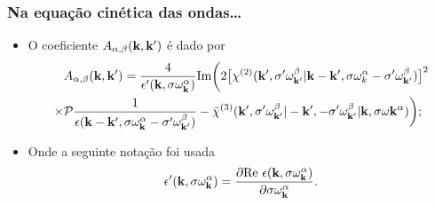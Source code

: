 \documentclass[10pt,aspectratio=1610,lualatex]{beamer}
\begin{document}
\begin{frame}
  \frametitle{Na equação cinética das ondas\dots}
  \begin{itemize}
    \item O coeficiente $A_{\alpha,\beta}({\bf k,k'})$ é dado por
    \begin{equation*}
      \begin{split}
	&A_{\alpha,\beta}({\bf k,k'})
	=\frac{4}{\epsilon '({\bf k},\sigma \omega_{\bf k}^{\alpha})}
	\mbox{Im}\biggl(2\bigl[\chi^{(2)} ({\bf k'},\sigma '
	\omega_{\bf k'}^{\beta}| {\bf k - k'},\sigma\omega_{k}^{\alpha}
	-\sigma ' \omega_{\bf k'}^{\beta})\bigr]^2\\
	\times&{\cal P}\frac{1}{\epsilon({\bf k-k'},
	  \sigma \omega_{\bf k}^{\alpha} -\sigma ' \omega_{\bf k'}^{\beta})}
	-\bar \chi^{(3)}({\bf k'},\sigma ' \omega_{\bf k'}^{\beta}|-{\bf k'},
	-\sigma ' \omega_{\bf k'}^{\beta}|{\bf k},
	\sigma\omega{\bf k}^{\alpha})\biggr);
	\label{coef-esp}
      \end{split}
    \end{equation*}
    \vspace{0.2cm}
    \item Onde a seguinte notação foi usada
    \begin{equation*}
      \epsilon '({\bf k},\sigma \omega_{\bf k}^{\alpha})
      =\frac{\partial \mbox{Re}\ \epsilon ({\bf k},\sigma \omega_{\bf k}^{\alpha})}
      {\partial \sigma \omega_{\bf k}^{\alpha}}.
    \end{equation*}
  \end{itemize}
\end{frame}
\end{document}
